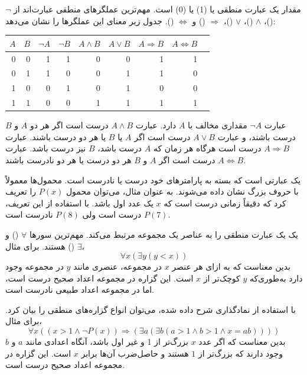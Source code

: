
مقدار یک عبارت منطقی یا
 (1) یا  (0) است.
مهم‌ترین عملگرهای منطقی عبارت‌اند از
$\lnot$ ()،
$\land$ ()،
$\lor$ ()،
$\Rightarrow$ () و
$\Leftrightarrow$ ().
جدول زیر معنای این عملگرها را نشان می‌دهد:

\begin{center}
\begin{tabular}{rr|rrrrrrr}
$A$ & $B$ & $\lnot A$ & $\lnot B$ & $A \land B$ & $A \lor B$ & $A \Rightarrow B$ & $A \Leftrightarrow B$ \\
\hline
0 & 0 & 1 & 1 & 0 & 0 & 1 & 1 \\
0 & 1 & 1 & 0 & 0 & 1 & 1 & 0 \\
1 & 0 & 0 & 1 & 0 & 1 & 0 & 0 \\
1 & 1 & 0 & 0 & 1 & 1 & 1 & 1 \\
\end{tabular}
\end{center}

عبارت $\lnot A$ مقداری مخالف با $A$ دارد.
عبارت $A \land B$ درست است اگر هر دو $A$ و $B$
درست باشند،
و عبارت $A \lor B$ درست است اگر $A$ یا $B$ یا هر دو
درست باشند.
عبارت $A \Rightarrow B$ درست است
هرگاه هر زمان که $A$ درست باشد، $B$ نیز درست باشد.
عبارت $A \Leftrightarrow B$ درست است
اگر $A$ و $B$ هر دو درست یا هر دو نادرست باشند.


یک  عبارتی است که بسته به پارامترهای خود
درست یا نادرست است.
محمول‌ها معمولاً با حروف بزرگ نشان داده می‌شوند.
به عنوان مثال، می‌توان محمول $P(x)$ را تعریف کرد
که دقیقاً زمانی درست است که $x$ یک عدد اول باشد.
با استفاده از این تعریف، $P(7)$ درست است ولی $P(8)$ نادرست است.


یک  یک عبارت منطقی را
به عناصر یک مجموعه مرتبط می‌کند.
مهم‌ترین سورها
$\forall$ () و $\exists$ () هستند.
برای مثال،
\[\forall x (\exists y (y < x))\]
بدین معناست که به ازای هر عنصر $x$ در مجموعه،
عنصری مانند $y$ در مجموعه وجود دارد
به‌طوری‌که $y$ کوچک‌تر از $x$ است.
این گزاره در مجموعه اعداد صحیح درست است،
اما در مجموعه اعداد طبیعی نادرست است.

با استفاده از نمادگذاری شرح داده شده،
می‌توان انواع گزاره‌های منطقی را بیان کرد.
برای مثال،
\[\forall x ((x>1 \land \lnot P(x)) \Rightarrow (\exists a (\exists b (a > 1 \land b > 1 \land x = ab))))\]
بدین معناست که اگر عدد $x$ بزرگ‌تر از 1
و غیر اول باشد،
آنگاه اعدادی مانند $a$ و $b$ وجود دارند
که بزرگ‌تر از $1$ هستند و حاصل‌ضرب آن‌ها برابر $x$ است.
این گزاره در مجموعه اعداد صحیح درست است.

